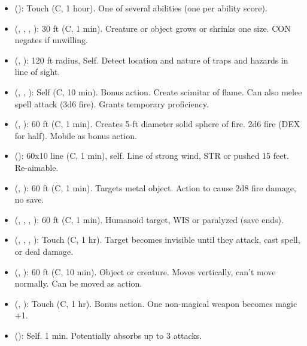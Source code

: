 \begin{itemize}
	\item {} (): Touch (C, 1 hour). One of several abilities (one per ability score).
	\item {} (, , , ): 30 ft (C, 1 min). Creature or object grows or shrinks one size. CON negates if unwilling.
	\item {} (, ): 120 ft radius, Self. Detect location and nature of traps and hazards in line of sight. 
	\item {} (, , ): Self (C, 10 min). Bonus action. Create scimitar of flame. Can also melee spell attack (3d6 fire). Grants temporary proficiency.
	\item {} (, ): 60 ft (C, 1 min). Creates 5-ft diameter solid sphere of fire. 2d6 fire (DEX for half). Mobile as bonus action.
	\item {} (): 60x10 line (C, 1 min), self. Line of strong wind, STR or pushed 15 feet. Re-aimable.
	\item {} (, ): 60 ft (C, 1 min). Targets metal object. Action to cause 2d8 fire damage, no save.
	\item {} (, , , ): 60 ft (C, 1 min). Humanoid target, WIS or paralyzed (save ends).
	\item {} (, , , ): Touch (C, 1 hr). Target becomes invisible until they attack, cast spell, or deal damage.
	\item {} (, ): 60 ft (C, 10 min). Object or creature. Moves vertically, can't move normally. Can be moved as action.
	\item {} (, ): Touch (C, 1 hr). Bonus action. One non-magical weapon becomes magic +1.
	\item {} (): Self. 1 min. Potentially absorbs up to 3 attacks.

\end{itemize}
